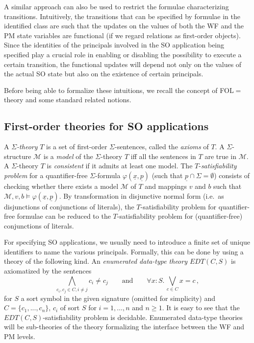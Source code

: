 \documentclass[conference]{IEEEtran}
\begin{document}
A similar approach can also be used to restrict the formulae
characterizing transitions.  Intuitively, the transitions that can be
specified by formulae in the identified class are such that the
updates on the values of both the WF and the PM state variables are
functional (if we regard relations as first-order objects).  Since the
identities of the principals involved in the SO application being
specified play a crucial role in enabling or disabling the possibility
to execute a certain transition, the functional updates will depend
not only on the values of the actual SO state but also on the
existence of certain principals.

Before being able to formalize these intuitions, we recall the concept
of FOL$=$ theory and some standard related notions.

\subsection{First-order theories for SO applications}
\label{subsec:fol-theories-for-SOAs}
A \emph{$\Sigma$-theory} $T$ is a set of first-order
$\Sigma$-sentences, called the \emph{axioms} of $T$.  A
$\Sigma$-structure $\mathcal{M}$ is a \emph{model} of the
$\Sigma$-theory $T$ iff all the sentences in $T$ are true in
$\mathcal{M}$.  A $\Sigma$-theory $T$ is \emph{consistent} if it
admits at least one model.
The $T$-\emph{satisfiability problem} for a quantifier-free
$\Sigma$-formula $\varphi(\underline{x},\underline{p})$ (such that
$\underline{p}\cap \Sigma=\emptyset$) consists of checking whether
there exists a model $\mathcal{M}$ of $T$ and mappings $v$ and $b$
such that $\mathcal{M},v,b \models
\varphi(\underline{x},\underline{p})$.  By transformation in
disjunctive normal form (i.e.~as disjunctions of conjunctions of
literals), the $T$-satisfiability problem for quantifier-free formulae
can be reduced to the $T$-satisfiability problem for (quantifier-free)
conjunctions of literals.

For specifying SO applications, we usually need to introduce a finite
set of unique identifiers to name the various principals.  Formally,
this can be done by using a theory of the following kind.  An
\emph{enumerated data-type theory $\mathit{EDT}(C,S)$} is axiomatized
by the sentences
\begin{displaymath}
  \bigwedge_{c_i,c_j\in C, i\neq j} c_i\neq c_j \qquad \text{and} \qquad
  \forall x:S.\, \bigvee_{c\in C} x = c \,,
\end{displaymath}
for $S$ a sort symbol in the given signature (omitted for simplicity)
and $C=\{c_1, ..., c_n\}$, $c_i$ of sort $\mathit{S}$ for $i=1,
\ldots, n$ and $n\geq 1$.  It is easy to see that the
$\mathit{EDT}(C,S)$-satisfiability problem is decidable.  Enumerated
data-type theories will be sub-theories of the theory formalizing the
interface between the WF and PM levels.
\end{document}
